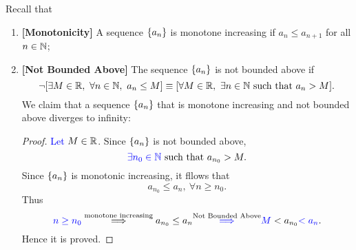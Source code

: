 \documentclass[11pt,openany]{article}
\begin{document}
\begin{note}
	Recall that \begin{enumerate}[]
	\item \textbf{[Monotonicity]} A sequence $\set{a_n}$ is monotone increasing if $a_n\leq a_{n+1}$ for all $n\in\mathbb{N}$;
	\item \textbf{[Not Bounded Above]} The sequence $\set{a_n}$ is not bounded above if \[
	\lnot[\exists M\in\R,\ \forall n\in\N,\ a_n\leq M]\equiv [\forall M\in\R,\ \exists n\in\N\ \text{such that}\ a_n>M].
	\] We claim that a sequence $\set{a_n}$ that is monotone increasing and not bounded above diverges to infinity:\par
	\begin{proof}
		\textcolor{blue}{Let $M\in\mathbb{R}$}. Since $\set{a_n}$ is not bounded above, \[
		\textcolor{blue}{\exists n_0\in\mathbb{N}}\ \text{such that}\ a_{n_0}>M.
		\] Since $\set{a_n}$ is monotonic increasing, it fllows that \[
		a_{n_0}\leq a_n,\ \forall n\geq n_0.
		\] Thus \[
		\textcolor{blue}{n\geq n_0}\overset{\text{monotone increasing}}{\implies} a_{n_0}\leq a_n\overset{\text{Not Bounded Above}}{\textcolor{blue}{\implies}}\textcolor{blue}{M}<a_{n_0}\textcolor{blue}{<a_n}.
		\] Hence it is proved.
	\end{proof}
\end{enumerate}
\end{note}
\end{document}
